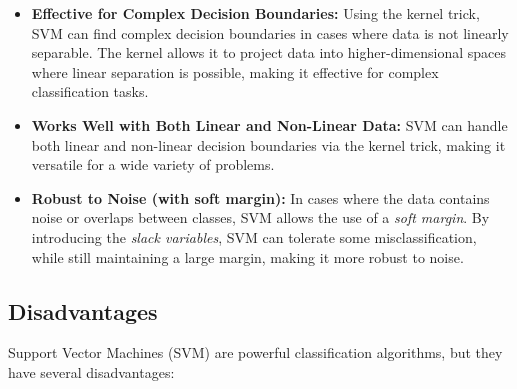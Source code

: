 \begin{itemize}
    \item \textbf{Effective for Complex Decision Boundaries:} Using the kernel trick, SVM can find complex decision boundaries in cases where data is not linearly separable.
    The kernel allows it to project data into higher-dimensional spaces where linear separation is possible, making it effective for complex classification tasks.

    \item \textbf{Works Well with Both Linear and Non-Linear Data:} SVM can handle both linear and non-linear decision boundaries via the kernel trick, making it versatile for a wide variety of problems.

    \item \textbf{Robust to Noise (with soft margin):} In cases where the data contains noise or overlaps between classes, SVM allows the use of a \textit{soft margin}.
    By introducing the \textit{slack variables}, SVM can tolerate some misclassification, while still maintaining a large margin, making it more robust to noise.
\end{itemize}

\subsection{Disadvantages}
\label{subsec:disadvantages-svm}

Support Vector Machines (SVM) are powerful classification algorithms, but they have several disadvantages:

